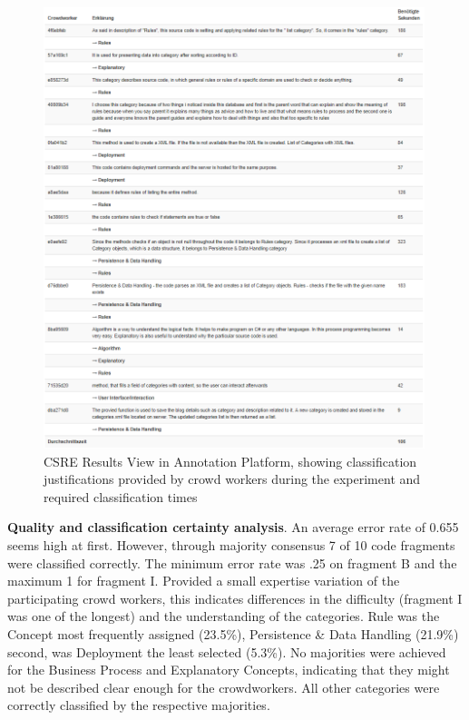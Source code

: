 \begin{figure}[h!]
\hypertarget{fig:crowdrationales}{%
\centering
\includegraphics[width=0.99\textwidth]{../figures/screenshots/csre_cw_answers.png}
\caption[CSRE Results View]{CSRE Results View in Annotation Platform, showing classification justifications provided by crowd workers during the experiment and required classification times}\label{fig:crowdrationales}
}
\end{figure}

\textbf{Quality and classification certainty analysis}. An average error rate of 0.655 seems high at first.
However, through majority consensus 7 of 10 code fragments were classified correctly.
The minimum error rate was .25 on fragment B and the maximum 1 for fragment I.
Provided a small expertise variation of the participating crowd workers, this indicates differences in the difficulty (fragment I was one of the longest) and the understanding of the categories.
Rule was the \gls{Concept} most frequently assigned (23.5\%), Persistence \& Data Handling (21.9\%) second, was Deployment the least selected (5.3\%).
No majorities were achieved for the Business Process and Explanatory \glspl{Concept}, indicating that they might not be described clear enough for the crowdworkers.
All other categories were correctly classified by the respective majorities.

